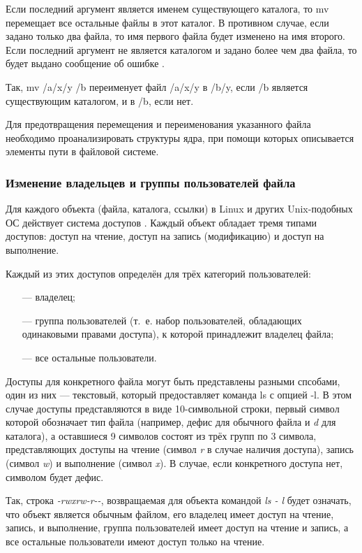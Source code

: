 Если последний аргумент является именем существующего каталога, то mv перемещает все остальные файлы в этот каталог. В противном случае, если задано только два файла, то имя первого файла будет изменено на имя второго. Если последний аргумент не является каталогом и задано более чем два файла, то будет выдано сообщение об ошибке \cite{mv-manual}.

Так, mv /a/x/y /b переименует файл /a/x/y в /b/y, если /b является существующим каталогом, и в /b, если нет.

Для предотвращения перемещения и переименования указанного файла необходимо проанализировать структуры ядра, при помощи которых описывается элементы пути в файловой системе.

\subsubsection{Изменение владельцев и группы пользователей файла}

Для каждого объекта (файла, каталога, ссылки) в Linux и других Unix-подобных ОС действует система доступов \cite{permission-definition}. Каждый объект обладает тремя типами доступов: доступ на чтение, доступ на запись (модификацию) и доступ на выполнение. 

Каждый из этих доступов определён для трёх категорий пользователей:  
\begin{itemize}[leftmargin=1.6\parindent]
	\item[---] владелец;
	\item[---] группа пользователей (т.~е. набор пользователей, обладающих одинаковыми правами доступа), к которой принадлежит владелец файла; 
	\item[---] все остальные пользователи.
\end{itemize}

Доступы для конкретного файла могут быть представлены разными спсобами, один из них --- текстовый, который предоставляет команда ls с опцией -l. В этом случае доступы представляются в виде 10-символьной строки, первый символ которой обозначает тип файла (например, дефис для обычного файла и \textit{d} для каталога), а оставшиеся 9 символов состоят из трёх групп по 3 символа, представляющих доступы на чтение (символ \textit{r} в случае наличия доступа), запись (символ \textit{w}) и выполнение (символ \textit{x}). В случае, если конкретного доступа нет, символом будет дефис.

Так, строка \textit{-rwxrw-r-\--}, возвращаемая для объекта командой \textit{ls - l} будет означать, что объект является обычным файлом, его владелец имеет доступ на чтение, запись, и выполнение, группа пользователей имеет доступ на чтение и запись, а все остальные пользователи имеют доступ только на чтение.

